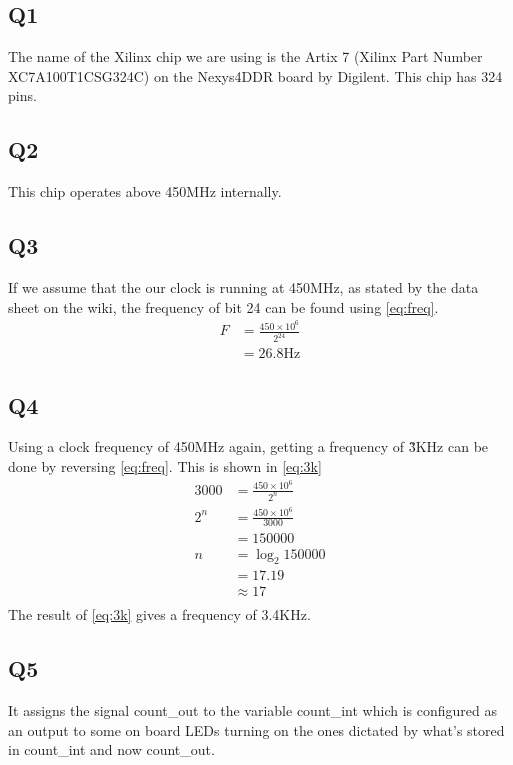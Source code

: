 \documentclass[a4paper, 12pt]{article}
\begin{document}
		\subsection{Q1}
			The name of the Xilinx chip we are using is the Artix 7 (Xilinx Part Number XC7A100T\-1CSG324C) on the Nexys4DDR board by Digilent. This chip has 324 pins.
		\subsection{Q2}
			This chip operates above 450MHz internally.
		\subsection{Q3}
			If we assume that the our clock is running at 450MHz, as stated by the data sheet on the wiki, the frequency of bit 24 can be found using \cref{eq:freq}.
			\begin{equation}
				\label{eq:freq}
				\begin{split}
					F & = \frac{450\times 10^6}{2^{24}}\\
					  & = 26.8 \text{Hz}
				\end{split}
			\end{equation}
		\subsection{Q4}
			Using a clock frequency of 450MHz again, getting a frequency of \~3KHz can be done by reversing \cref{eq:freq}. This is shown in \cref{eq:3k}
			\begin{equation}
				\label{eq:3k}
				\begin{split}
					3000 & = \frac{450\times 10^6}{2^{n}}\\
					2^n  & = \frac{450\times 10^6}{3000}\\
						 & = 150000\\
					n    & = \log_{2}{150000}\\
						 & = 17.19\\
						 & \approx 17\\
				\end{split}
			\end{equation}
			The result of \cref{eq:3k} gives a frequency of 3.4KHz.
		\subsection{Q5}
			It assigns the signal count\_out to the variable count\_int which is configured as an output to some on board LEDs turning on the ones dictated by what's stored in count\_int and now count\_out.
\end{document}
